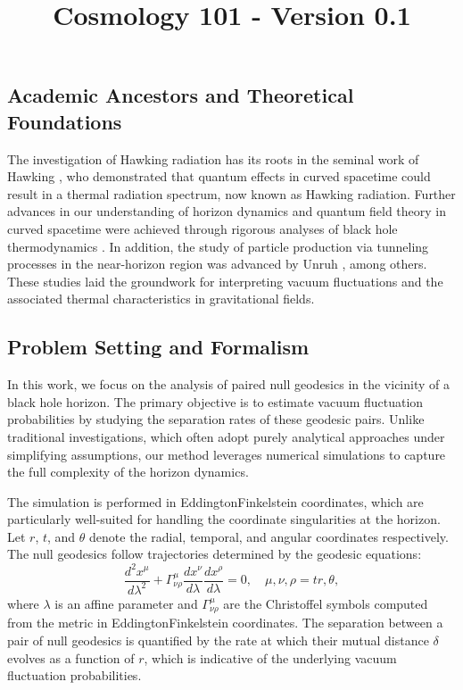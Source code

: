 \documentclass{article}\usepackage{graphicx} \usepackage{amsmath} \usepackage{colortbl}\title{Cosmology 101 - Version 0.1}
\begin{document}
\subsection{Academic Ancestors and Theoretical Foundations}
The investigation of Hawking radiation has its roots in the seminal work of Hawking \cite{Hawking1975}, who demonstrated that quantum effects in curved spacetime could result in a thermal radiation spectrum, now known as Hawking radiation. Further advances in our understanding of horizon dynamics and quantum field theory in curved spacetime were achieved through rigorous analyses of black hole thermodynamics \cite{Jacobson1993}. In addition, the study of particle production via tunneling processes in the near-horizon region was advanced by Unruh \cite{Unruh1976}, among others. These studies laid the groundwork for interpreting vacuum fluctuations and the associated thermal characteristics in gravitational fields.

\subsection{Problem Setting and Formalism}
In this work, we focus on the analysis of paired null geodesics in the vicinity of a black hole horizon. The primary objective is to estimate vacuum fluctuation probabilities by studying the separation rates of these geodesic pairs. Unlike traditional investigations, which often adopt purely analytical approaches under simplifying assumptions, our method leverages numerical simulations to capture the full complexity of the horizon dynamics.

The simulation is performed in Eddington\textendash Finkelstein coordinates, which are particularly well-suited for handling the coordinate singularities at the horizon. Let $r$, $t$, and $\theta$ denote the radial, temporal, and angular coordinates respectively. The null geodesics follow trajectories determined by the geodesic equations:
\begin{equation}
\frac{d^2 x^\mu}{d\lambda^2} + \Gamma^\mu_{\nu \rho}\frac{dx^\nu}{d\lambda}\frac{dx^\rho}{d\lambda} = 0, \quad \mu,\nu,\rho = t r,\theta, \label{eq:geodesic}
\end{equation}
where $\lambda$ is an affine parameter and $\Gamma^\mu_{\nu \rho}$ are the Christoffel symbols computed from the metric in Eddington\textendash Finkelstein coordinates. The separation between a pair of null geodesics is quantified by the rate at which their mutual distance $\delta$ evolves as a function of $r$, which is indicative of the underlying vacuum fluctuation probabilities.
\end{document}
